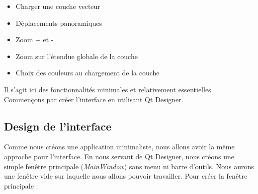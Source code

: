 \begin{itemize}
\item Charger une couche vecteur
\item Déplacements panoramiques
\item Zoom + et -
\item Zoom sur l'étendue globale de la couche
\item Choix des couleurs au chargement de la couche
\end{itemize} 

Il s'agit ici des fonctionnalités minimales et relativement essentielles. Commençons par créer l'interface en utilisant Qt Designer.

\subsection{Design de l'interface}

Comme nous créons une application minimaliste, nous allons avoir la même approche pour l'interface. En nous servant de Qt Designer, nous créons une simple fenêtre principale (\textit{MainWindow}) sans menu ni barre d'outils. Nous aurons une fenêtre vide sur laquelle nous allons pouvoir travailler. Pour créer la fenêtre principale :

